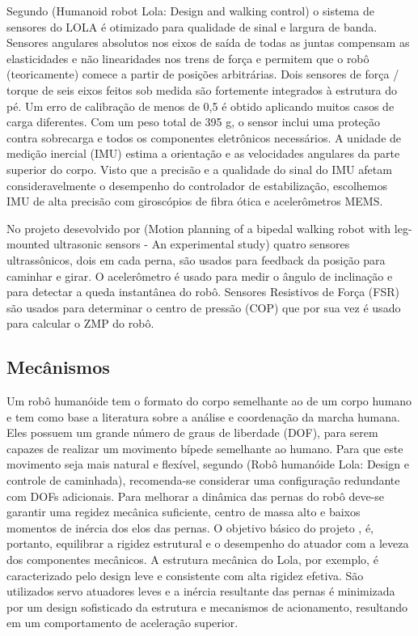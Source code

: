 Segundo (Humanoid robot Lola: Design and walking control) o sistema de sensores do LOLA é otimizado para qualidade de sinal e largura de banda. Sensores angulares absolutos nos eixos de saída de todas as juntas compensam as elasticidades e não linearidades nos trens de força e permitem que o robô (teoricamente) comece a partir de posições arbitrárias. Dois sensores de força / torque de seis eixos feitos sob medida são fortemente integrados à estrutura do pé. Um erro de calibração de menos de 0,5 é obtido aplicando muitos casos de carga diferentes. Com um peso total de 395 g, o sensor inclui uma proteção contra sobrecarga e todos os componentes eletrônicos necessários. A unidade de medição inercial (IMU) estima a orientação e as velocidades angulares da parte superior do corpo. Visto que a precisão e a qualidade do sinal do IMU afetam consideravelmente o desempenho do controlador de estabilização, escolhemos IMU de alta precisão com giroscópios de fibra ótica e acelerômetros MEMS.

No projeto desevolvido por (Motion  planning  of  a  bipedal  walking  robot  with  leg-mounted ultrasonic  sensors  -  An  experimental  study) quatro sensores ultrassônicos, dois em cada perna, são usados para feedback da posição para caminhar e girar. O acelerômetro é usado para medir o ângulo de inclinação e para detectar a queda instantânea do robô. Sensores Resistivos de Força (FSR) são usados para determinar o centro de pressão (COP) que por sua vez é usado para calcular o ZMP do robô.


\subsection{Mecânismos}
\label{ssec:mec}

Um robô humanóide tem o formato do corpo semelhante ao de um corpo humano e tem como base a literatura sobre a análise e coordenação da marcha humana. Eles possuem um grande número de graus de liberdade (DOF), para serem capazes de realizar um movimento bípede semelhante ao humano. Para que este movimento seja mais natural e flexível, segundo (Robô humanóide Lola: Design e controle de caminhada), recomenda-se considerar uma configuração redundante com DOFs adicionais.
Para melhorar a dinâmica das pernas do robô deve-se garantir uma regidez mecânica suficiente, centro de massa alto e baixos momentos de inércia dos elos das pernas.
O objetivo básico do projeto , é, portanto, equilibrar a rigidez estrutural e o desempenho do atuador com a leveza dos componentes mecânicos.
A estrutura mecânica do Lola, por exemplo, é caracterizado pelo design leve e consistente com alta rigidez efetiva.
São utilizados servo atuadores leves e a inércia resultante das pernas é minimizada por um design sofisticado da estrutura e mecanismos de acionamento, resultando em um comportamento de aceleração superior.

